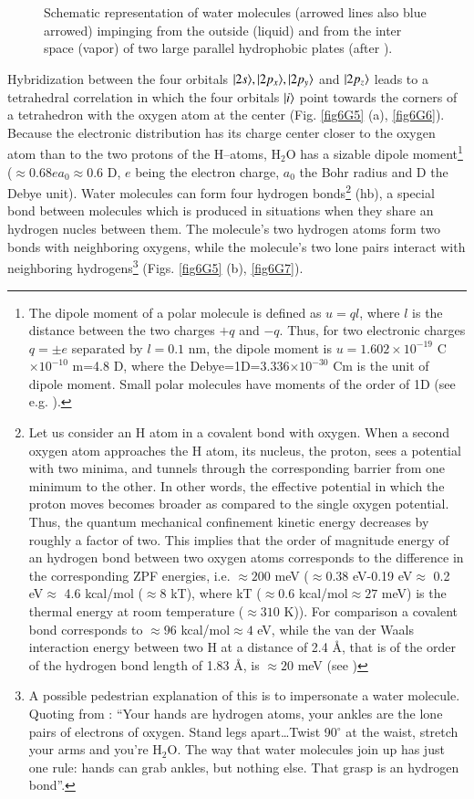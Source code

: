 \begin{subappendices}
\begin{figure}
\caption{Schematic representation of water molecules (arrowed lines also blue arrowed) impinging from the outside (liquid) and from the inter space (vapor) of two large parallel hydrophobic plates (after \cite{Lum:99}).}\label{fig6G8}
\end{figure}
Hybridization between the four orbitals $|{2s} \rangle,|{2p_x} \rangle,|{2p_y} \rangle$ and $|{2p_z} \rangle$ leads to a tetrahedral correlation in which the four orbitals $|{i} \rangle$ point towards the corners of a tetrahedron with the oxygen atom at the center (Fig. \ref{fig6G5} (a), \ref{fig6G6}). Because the electronic distribution has its charge center closer to the oxygen atom than to the two protons of the H--atoms, H$_2$O has a sizable dipole moment\footnote{The dipole moment of a polar molecule is defined as $u=ql$, where $l$ is the distance between the two charges $+q$ and $-q$. Thus, for two electronic charges $q=\pm e$ separated by $l=0.1$ nm, the dipole moment is $u=1.602\times 10^{-19}$ C$\times10^{-10}$ m=4.8 D, where the Debye=1D=3.336$\times10^{-30}$ Cm is the unit of dipole moment. Small polar molecules have moments of the order of 1D (see e.g. \cite{Israelachvili:85}). } ($\approx 0.68 ea_0\approx0.6$ D, $e$ being the electron charge, $a_0$ the Bohr radius and D the Debye unit). Water molecules can form four hydrogen bonds\footnote{Let us consider an H atom in a covalent bond with oxygen. When a second oxygen atom approaches the H atom, its nucleus, the proton, sees a potential with two minima, and tunnels through the corresponding barrier from one minimum to the other. In other words, the effective potential in which the proton moves becomes broader as compared to the single oxygen potential. Thus, the quantum mechanical confinement kinetic energy decreases by roughly a factor of two. This implies that the order of magnitude energy of an hydrogen bond between two oxygen atoms corresponds to the difference in the corresponding ZPF energies, i.e. $\approx200$ meV ($\approx 0.38$ eV-0.19 eV$\approx$ 0.2 eV$\approx$ 4.6 kcal/mol ($\approx8$ kT), where kT ($\approx0.6$ kcal/mol$\approx27$ meV) is the thermal energy at room temperature ($\approx310$ K)). For comparison a covalent  bond corresponds to $\approx96$ kcal/mol$\approx4$ eV, while the van der Waals interaction energy between two H at a distance of 2.4 \AA, that is of the order of the hydrogen bond length of 1.83 \AA,  is $\approx20$ meV (see \cite{Povh:02})} (hb), a special bond between molecules which is produced in situations when they share an hydrogen nucles between them. The molecule's two hydrogen atoms form two bonds with neighboring oxygens, while the molecule's two lone pairs interact with neighboring hydrogens\footnote{A possible pedestrian explanation of this is to impersonate a water molecule. Quoting from \cite{Ball:03}: ``Your hands are hydrogen atoms, your ankles are the lone pairs of electrons of oxygen. Stand legs apart\dots Twist 90$^\circ$ at the waist, stretch your arms and you're H$_2$O. The way that water molecules join up has just one rule: hands can grab ankles, but nothing else. That grasp is an hydrogen bond''.} (Figs. \ref{fig6G5} (b), \ref{fig6G7}). 



\end{subappendices}
